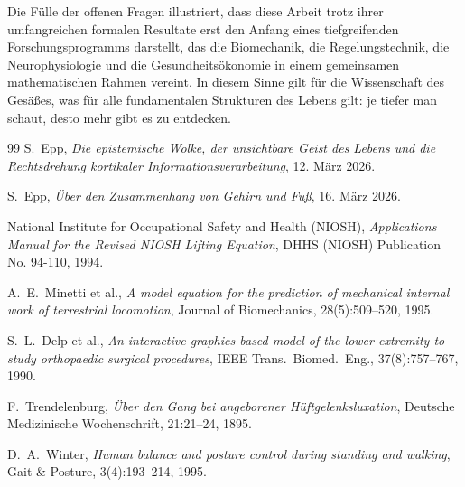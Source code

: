 ﻿\documentclass[12pt,a4paper]{report}
\theoremstyle{plain}
\theoremstyle{definition}
\theoremstyle{remark}
\begin{document}
	\bigskip
	\noindent Die Fülle der offenen Fragen illustriert, dass diese Arbeit
	trotz ihrer umfangreichen formalen Resultate erst den Anfang
	eines tiefgreifenden Forschungsprogramms darstellt, das die
	Biomechanik, die Regelungstechnik, die Neurophysiologie und die
	Gesundheitsökonomie in einem gemeinsamen mathematischen Rahmen vereint.
	In diesem Sinne gilt für die Wissenschaft des Gesäßes, was für alle
	fundamentalen Strukturen des Lebens gilt: je tiefer man schaut,
	desto mehr gibt es zu entdecken.
	
	\begin{thebibliography}{99}
		S.~Epp, \emph{Die epistemische Wolke, der unsichtbare Geist des Lebens
			und die Rechtsdrehung kortikaler Informationsverarbeitung}, 12. März 2026.
		
		S.~Epp, \emph{Über den Zusammenhang von Gehirn und Fuß}, 16. März 2026.
		
		National Institute for Occupational Safety and Health (NIOSH),
		\emph{Applications Manual for the Revised NIOSH Lifting Equation},
		DHHS (NIOSH) Publication No. 94-110, 1994.
		
		A.~E.~Minetti et al.,
		\emph{A model equation for the prediction of mechanical internal work
			of terrestrial locomotion},
		Journal of Biomechanics, 28(5):509--520, 1995.
		
		S.~L.~Delp et al.,
		\emph{An interactive graphics-based model of the lower extremity
			to study orthopaedic surgical procedures},
		IEEE Trans.~Biomed.~Eng., 37(8):757--767, 1990.
		
		F.~Trendelenburg,
		\emph{Über den Gang bei angeborener Hüftgelenksluxation},
		Deutsche Medizinische Wochenschrift, 21:21--24, 1895.
		
		D.~A.~Winter,
		\emph{Human balance and posture control during standing and walking},
		Gait \& Posture, 3(4):193--214, 1995.
	\end{thebibliography}
	
\end{document}
